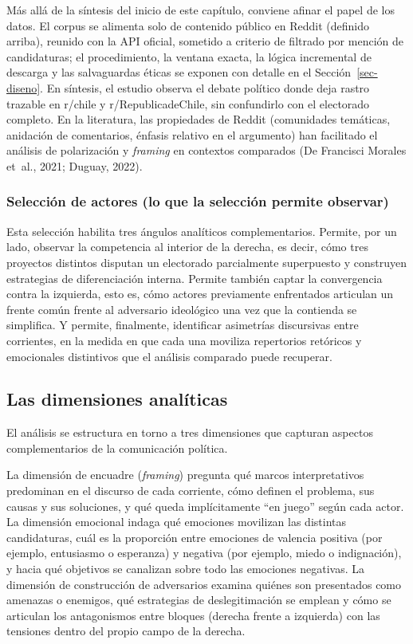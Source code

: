 \documentclass[
  letterpaper,
  numbers=noendperiod,
  fontsize=11pt,
  DIV=12,
  titlepage=false]{scrreprt}
\begin{document}
\endgroup{}

Más allá de la síntesis del inicio de este capítulo, conviene afinar el
papel de los datos. El corpus se alimenta solo de contenido público en
Reddit (definido arriba), reunido con la API oficial, sometido a
criterio de filtrado por mención de candidaturas; el procedimiento, la
ventana exacta, la lógica incremental de descarga y las salvaguardas
éticas se exponen con detalle en el Sección~\ref{sec-diseno}. En
síntesis, el estudio observa el debate político donde deja rastro
trazable en r/chile y r/RepublicadeChile, sin confundirlo con el
electorado completo. En la literatura, las propiedades de Reddit
(comunidades temáticas, anidación de comentarios, énfasis relativo en el
argumento) han facilitado el análisis de polarización y \emph{framing}
en contextos comparados (De Francisci Morales et~al., 2021; Duguay,
2022).

\subsubsection{Selección de actores (lo que la selección permite
observar)}\label{selecciuxf3n-de-actores-lo-que-la-selecciuxf3n-permite-observar}

Esta selección habilita tres ángulos analíticos complementarios.
Permite, por un lado, observar la competencia al interior de la derecha,
es decir, cómo tres proyectos distintos disputan un electorado
parcialmente superpuesto y construyen estrategias de diferenciación
interna. Permite también captar la convergencia contra la izquierda,
esto es, cómo actores previamente enfrentados articulan un frente común
frente al adversario ideológico una vez que la contienda se simplifica.
Y permite, finalmente, identificar asimetrías discursivas entre
corrientes, en la medida en que cada una moviliza repertorios retóricos
y emocionales distintivos que el análisis comparado puede recuperar.

\subsection{Las dimensiones
analíticas}\label{las-dimensiones-analuxedticas}

El análisis se estructura en torno a tres dimensiones que capturan
aspectos complementarios de la comunicación política.

La dimensión de encuadre (\emph{framing}) pregunta qué marcos
interpretativos predominan en el discurso de cada corriente, cómo
definen el problema, sus causas y sus soluciones, y qué queda
implícitamente ``en juego'' según cada actor. La dimensión emocional
indaga qué emociones movilizan las distintas candidaturas, cuál es la
proporción entre emociones de valencia positiva (por ejemplo, entusiasmo
o esperanza) y negativa (por ejemplo, miedo o indignación), y hacia qué
objetivos se canalizan sobre todo las emociones negativas. La dimensión
de construcción de adversarios examina quiénes son presentados como
amenazas o enemigos, qué estrategias de deslegitimación se emplean y
cómo se articulan los antagonismos entre bloques (derecha frente a
izquierda) con las tensiones dentro del propio campo de la derecha.
\end{document}
